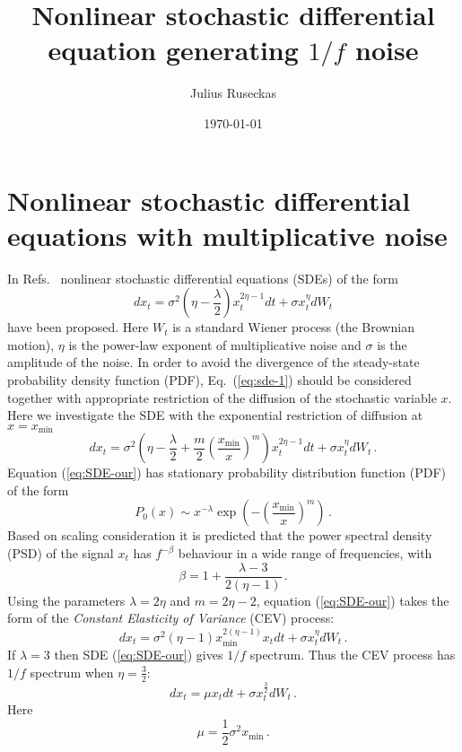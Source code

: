 \documentclass{article}
\begin{document}
\title{Nonlinear stochastic differential equation generating $1/f$ noise}

\author{Julius Ruseckas}

\date{\today{}}

\maketitle

\section{Nonlinear stochastic differential equations with multiplicative noise}

In Refs.~\cite{kaulakys2004,kaulakys2006} nonlinear stochastic differential
equations (SDEs) of the form
\begin{equation}
dx_{t}=\sigma^{2}\left(\eta-\frac{\lambda}{2}\right)x_{t}^{2\eta-1}dt
+\sigma x_{t}^{\eta}dW_{t}\label{eq:sde-1}
\end{equation}
have been proposed. Here $W_{t}$ is a standard Wiener process (the
Brownian motion), $\eta$ is the power-law exponent of multiplicative
noise and $\sigma$ is the amplitude of the noise. In order to avoid
the divergence of the steady-state probability density function (PDF),
Eq.~(\ref{eq:sde-1}) should be considered together with appropriate
restriction of the diffusion of the stochastic variable $x$. Here
we investigate the SDE with the exponential restriction of diffusion
at $x=x_{\mathrm{min}}$
\begin{equation}
dx_{t}=\sigma^{2}\left(\eta-\frac{\lambda}{2}+\frac{m}{2}
\left(\frac{x_{\mathrm{min}}}{x}\right)^{m}\right)x_{t}^{2\eta-1}dt
+\sigma x_{t}^{\eta}dW_{t}\,.
\label{eq:SDE-our}
\end{equation}
Equation (\ref{eq:SDE-our}) has stationary probability distribution
function (PDF) of the form
\begin{equation}
P_{0}(x)\sim x^{-\lambda}
\exp\left(-\left(\frac{x_{\mathrm{min}}}{x}\right)^{m}\right)\,.
\end{equation}
Based on scaling consideration \cite{ruseckas2014} it is predicted
that the power spectral density (PSD) of the signal $x_{t}$ has $f^{-\beta}$
behaviour in a wide range of frequencies, with 
\begin{equation}
\beta=1+\frac{\lambda-3}{2(\eta-1)}\,.
\end{equation}
Using the parameters $\lambda=2\eta$ and $m=2\eta-2$, equation
(\ref{eq:SDE-our}) takes the form of the \emph{Constant Elasticity of Variance}
(CEV) process:
\begin{equation}
dx_{t}=\sigma^{2}(\eta-1)x_{\mathrm{min}}^{2(\eta-1)}x_{t}dt
+\sigma x_{t}^{\eta}dW_{t}\,.
\end{equation}
If $\lambda=3$ then SDE (\ref{eq:SDE-our}) gives $1/f$ spectrum.
Thus the CEV process has $1/f$ spectrum when $\eta=\frac{3}{2}$:
\begin{equation}
dx_{t}=\mu x_{t}dt+\sigma x_{t}^{\frac{3}{2}}dW_{t}\,.\label{eq:SDE-CEV}
\end{equation}
Here
\begin{equation}
\mu=\frac{1}{2}\sigma^{2}x_{\mathrm{min}}\,.
\end{equation}
\end{document}
